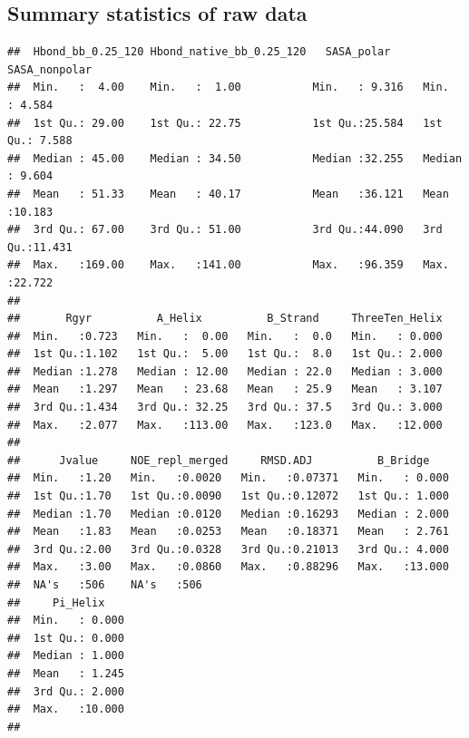 \documentclass{article}\usepackage[table]{xcolor}
\makeatletter
\newenvironment{kframe}{%
 \def\at@end@of@kframe{}%
 \ifinner\ifhmode%
  \def\at@end@of@kframe{\end{minipage}}%
  \begin{minipage}{\columnwidth}%
 \fi\fi%
 \def\FrameCommand##1{\hskip\@totalleftmargin \hskip-\fboxsep
 \colorbox{shadecolor}{##1}\hskip-\fboxsep
     \hskip-\linewidth \hskip-\@totalleftmargin \hskip\columnwidth}%
 \MakeFramed {\advance\hsize-\width
   \@totalleftmargin\z@ \linewidth\hsize
   \@setminipage}}%
 {\par\unskip\endMakeFramed%
 \at@end@of@kframe}
\newenvironment{knitrout}{}{} %
\renewcommand{\$}{$} %
\makeatother
\begin{document}
\subsection{Summary statistics of raw data}
\begin{knitrout}
\color{fgcolor}\begin{kframe}
\begin{verbatim}
##  Hbond_bb_0.25_120 Hbond_native_bb_0.25_120   SASA_polar     SASA_nonpolar   
##  Min.   :  4.00    Min.   :  1.00           Min.   : 9.316   Min.   : 4.584  
##  1st Qu.: 29.00    1st Qu.: 22.75           1st Qu.:25.584   1st Qu.: 7.588  
##  Median : 45.00    Median : 34.50           Median :32.255   Median : 9.604  
##  Mean   : 51.33    Mean   : 40.17           Mean   :36.121   Mean   :10.183  
##  3rd Qu.: 67.00    3rd Qu.: 51.00           3rd Qu.:44.090   3rd Qu.:11.431  
##  Max.   :169.00    Max.   :141.00           Max.   :96.359   Max.   :22.722  
##                                                                              
##       Rgyr          A_Helix          B_Strand     ThreeTen_Helix  
##  Min.   :0.723   Min.   :  0.00   Min.   :  0.0   Min.   : 0.000  
##  1st Qu.:1.102   1st Qu.:  5.00   1st Qu.:  8.0   1st Qu.: 2.000  
##  Median :1.278   Median : 12.00   Median : 22.0   Median : 3.000  
##  Mean   :1.297   Mean   : 23.68   Mean   : 25.9   Mean   : 3.107  
##  3rd Qu.:1.434   3rd Qu.: 32.25   3rd Qu.: 37.5   3rd Qu.: 3.000  
##  Max.   :2.077   Max.   :113.00   Max.   :123.0   Max.   :12.000  
##                                                                   
##      Jvalue     NOE_repl_merged     RMSD.ADJ          B_Bridge     
##  Min.   :1.20   Min.   :0.0020   Min.   :0.07371   Min.   : 0.000  
##  1st Qu.:1.70   1st Qu.:0.0090   1st Qu.:0.12072   1st Qu.: 1.000  
##  Median :1.70   Median :0.0120   Median :0.16293   Median : 2.000  
##  Mean   :1.83   Mean   :0.0253   Mean   :0.18371   Mean   : 2.761  
##  3rd Qu.:2.00   3rd Qu.:0.0328   3rd Qu.:0.21013   3rd Qu.: 4.000  
##  Max.   :3.00   Max.   :0.0860   Max.   :0.88296   Max.   :13.000  
##  NA's   :506    NA's   :506                                        
##     Pi_Helix     
##  Min.   : 0.000  
##  1st Qu.: 0.000  
##  Median : 1.000  
##  Mean   : 1.245  
##  3rd Qu.: 2.000  
##  Max.   :10.000  
## 
\end{verbatim}
\end{kframe}
\end{knitrout}
\end{document}
